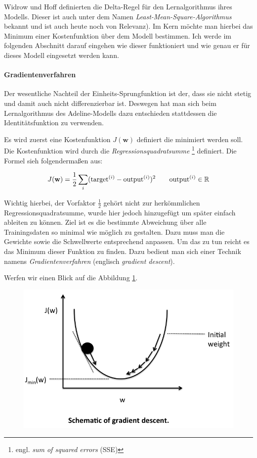 Widrow und Hoff definierten die Delta-Regel für den Lernalgorithmus ihres Modells. Dieser ist auch unter dem Namen \emph{Least-Mean-Square-Algorithmus} bekannt und ist auch heute noch von Relevanz). Im Kern möchte man hierbei das Minimum einer Kostenfunktion über dem Modell bestimmen. Ich werde im folgenden Abschnitt darauf eingehen wie dieser funktioniert und wie genau er für dieses Modell eingesetzt werden kann. 

\paragraph{Gradientenverfahren}
Der wesentliche Nachteil der Einheits-Sprungfunktion ist der, dass sie nicht stetig und damit auch nicht differenzierbar ist. Deswegen hat man sich beim Lernalgorithmus des Adeline-Modells dazu entschieden stattdessen die Identitätsfunktion zu verwenden. 

Es wird zuerst eine Kostenfunktion ${J(\mathbf{w})}$ definiert die minimiert werden soll. Die Kostenfunktion wird durch die \emph{Regressionsquadratsumme} \footnote{engl. \emph{sum of squared errors} (SSE)} definiert. Die Formel sieh folgendermaßen aus: 

\begin{equation}
J(\mathbf{w})  = \frac{1}{2} \sum_{i} (\text{target}^{(i)} - \text{output}^{(i)})^2 \quad \quad \text{output}^{(i)} \in \mathbb{R} \\
\end{equation}

Wichtig hierbei, der Vorfaktor ${ \frac{1}{2} }$ gehört nicht zur herkömmlichen Regressionsquadratsumme, wurde hier jedoch hinzugefügt um später einfach ableiten zu können. Ziel ist es die bestimmte Abweichung über alle Trainingsdaten so minimal wie möglich zu gestalten. Dazu muss man die Gewichte sowie die Schwellwerte entsprechend anpassen. Um das zu tun reicht es das Minimum dieser Funktion zu finden. Dazu bedient man sich einer Technik namens \emph{Gradientenverfahren} (englisch \emph{gradient descent}). 

Werfen wir einen Blick auf die Abbildung \ref{fig:ad_gd1}. 

\begin{figure}[!htb]
	\centering
	\includegraphics[width=.7\linewidth]{img/adeline_gd1}
	\label{fig:ad_gd1}
\end{figure}

